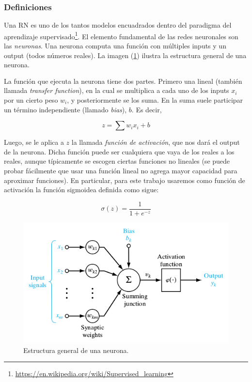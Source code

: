 \subsubsection{Definiciones}

Una RN es uno de los tantos modelos encuadrados dentro del paradigma del aprendizaje supervisado\footnote{\url{https://en.wikipedia.org/wiki/Supervised_learning}}. El elemento fundamental de las redes neuronales son las \emph{neuronas}. Una neurona computa una función con múltiples inputs y un output (todos números reales). La imagen (\ref{fig:neurona}) ilustra la estructura general de una neurona.

La función que ejecuta la neurona tiene dos partes. Primero una lineal (también llamada \emph{transfer function}), en la cual se multiplica a cada uno de los inputs $x_i$ por un cierto peso $w_i$, y posteriormente se los suma. En la suma suele participar un término independiente (llamado \emph{bias}), $b$. Es decir,

$$z = \sum w_i x_i + b$$

Luego, se le aplica a $z$ la llamada \emph{función de activación}, que nos dará el output de la neurona. Dicha función puede ser cualquiera que vaya de los reales a los reales, aunque típicamente se escogen ciertas funciones no lineales (se puede probar fácilmente que usar una función lineal no agrega mayor capacidad para aproximar funciones). En particular, para este trabajo usaremos como función de activación la función sigmoidea definida como sigue:

$$\sigma(z) = \frac{1}{1 + e^{-z}}$$

\begin{figure}[H]
  \begin{center}  
    \includegraphics[width=0.8\linewidth]{imgs/neuron.png}
  \end{center}
  \caption{Estructura general de una neurona. }
  \label{fig:neurona}
\end{figure}

